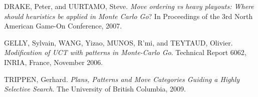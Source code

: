 \begin{thebibliography}{99}
	{\sc DRAKE,} Peter, and {\sc UURTAMO,} Steve.
	\emph{Move ordering vs heavy playouts: Where should heuristics be applied
	in Monte Carlo Go}?
	In Proceedings of the 3rd North American Game-On Conference, 2007.

	{\sc GELLY,} Sylvain, {\sc WANG,} Yizao, {\sc MUNOS,} R'mi, and {\sc
	TEYTAUD,} Olivier.
	\emph{Modification of UCT with patterns in Monte-Carlo Go}.
	Technical Report 6062, INRIA, France, November 2006.

	{\sc TRIPPEN,} Gerhard.
	\emph{Plans, Patterns and Move Categories Guiding a Highly Selective Search}.
	The University of British Columbia, 2009.

\end{thebibliography}

